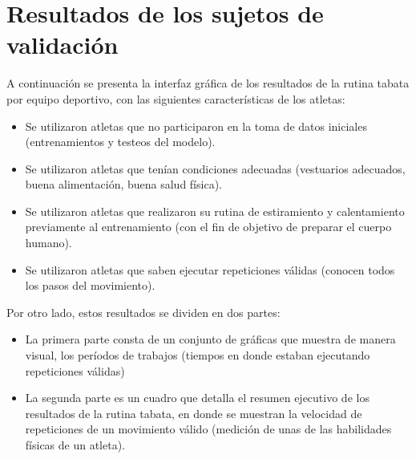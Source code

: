 \section{Resultados de los sujetos de validaci\'on} \label{res:valResults}
A continuaci\'on se presenta la interfaz gr\'afica de los resultados de la rutina tabata por equipo deportivo, con las siguientes caracter\'isticas de los atletas:
\begin{itemize}
\item Se utilizaron atletas que no participaron en la toma de datos iniciales (entrenamientos y testeos del modelo).
\item Se utilizaron atletas que ten\'ian  condiciones adecuadas (vestuarios adecuados, buena alimentaci\'on,  buena salud f\'isica).
\item Se utilizaron atletas que realizaron su rutina de estiramiento y calentamiento previamente al entrenamiento (con el fin de objetivo de preparar el cuerpo humano).
\item Se utilizaron atletas que saben ejecutar repeticiones v\'alidas (conocen todos los pasos del movimiento). 
\end{itemize}
\medbreak
Por otro lado, estos resultados se dividen en dos partes:
\begin{itemize}
\item La primera parte consta de un conjunto de gr\'aficas que muestra de manera visual, los per\'iodos de trabajos (tiempos en donde estaban ejecutando repeticiones v\'alidas)
\item La segunda parte es un cuadro que detalla el  resumen ejecutivo de los resultados de la rutina tabata, en donde se muestran la velocidad de repeticiones de un movimiento v\'alido (medici\'on de unas de las habilidades f\'isicas de un atleta).
\end{itemize}
